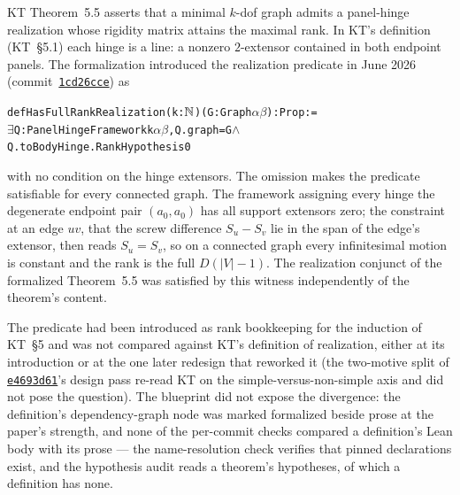 KT Theorem~5.5 asserts that a minimal $k$-dof graph admits a
panel-hinge realization whose rigidity matrix attains the maximal rank.
In KT's definition (KT~\S5.1) each hinge is a line: a nonzero
$2$-extensor contained in both endpoint panels. The formalization
introduced the realization predicate in June 2026
(commit~\href{https://github.com/bryangingechen/CombinatorialRigidity/commit/1cd26ccee6d8412a55740f2d9661934b5456701a}{\texttt{1cd26cce}})
as
\begin{alltt}
def HasFullRankRealization (k : \(\N\)) (G : Graph \(\alpha\) \(\beta\)) : Prop :=
  \(\exists\) Q : PanelHingeFramework k \(\alpha\) \(\beta\), Q.graph = G \(\wedge\)
    Q.toBodyHinge.RankHypothesis 0
\end{alltt}
with no condition on the hinge extensors. The omission makes the
predicate satisfiable for every connected graph. The framework
assigning every hinge the degenerate endpoint pair $(a_0, a_0)$ has all
support extensors zero; the constraint at an edge $uv$, that the screw
difference $S_u - S_v$ lie in the span of the edge's extensor, then
reads $S_u = S_v$, so on a connected graph every infinitesimal motion is
constant and the rank is the full $D(|V|-1)$. The realization conjunct
of the formalized Theorem~5.5 was satisfied by this witness
independently of the theorem's content.

The predicate had been introduced as rank bookkeeping for the induction
of KT~\S5 and was not compared against KT's definition of realization,
either at its introduction or at the one later redesign that reworked
it (the two-motive split of
\href{https://github.com/bryangingechen/CombinatorialRigidity/commit/e4693d6170908c480e4f06924f2ea0a95ce9ba3f}{\texttt{e4693d61}}'s
design pass re-read KT on the simple-versus-non-simple axis and did not
pose the question). The blueprint did not expose the divergence: the
definition's dependency-graph node was marked formalized beside prose
at the paper's strength, and none of the per-commit checks compared a
definition's Lean body with its prose --- the name-resolution check
verifies that pinned declarations exist, and the hypothesis audit reads
a theorem's hypotheses, of which a definition has none.

